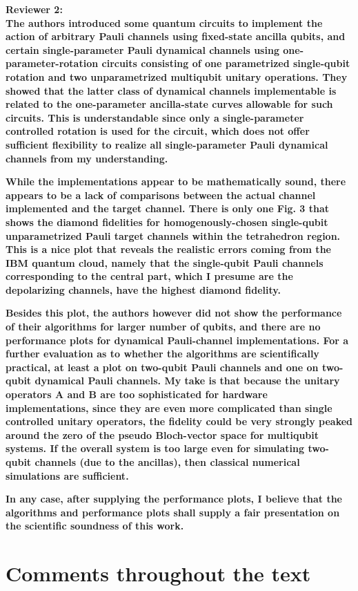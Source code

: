\documentclass[10pt,letterpaper]{article} %
\begin{document}
\textbf{Reviewer 2:} \\
\textbf{The authors introduced some quantum circuits to implement the action
of arbitrary Pauli channels using fixed-state ancilla qubits, and
certain single-parameter Pauli dynamical channels using
one-parameter-rotation circuits consisting of one parametrized
single-qubit rotation and two unparametrized multiqubit unitary
operations. They showed that the latter class of dynamical channels
implementable is related to the one-parameter ancilla-state curves
allowable for such circuits. This is understandable since only a
single-parameter controlled rotation is used for the circuit, which
does not offer sufficient flexibility to realize all single-parameter
Pauli dynamical channels from my understanding.}

\textbf{While the implementations appear to be mathematically sound, there
appears to be a lack of comparisons between the actual channel
implemented and the target channel. There is only one Fig. 3 that
shows the diamond fidelities for homogenously-chosen single-qubit
unparametrized Pauli target channels within the tetrahedron region.
This is a nice plot that reveals the realistic errors coming from the
IBM quantum cloud, namely that the single-qubit Pauli channels
corresponding to the central part, which I presume are the
depolarizing channels, have the highest diamond fidelity.}

\textbf{
Besides this plot, the authors however did not show the performance of
their algorithms for larger number of qubits, and there are no
performance plots for dynamical Pauli-channel implementations. For a
further evaluation as to whether the algorithms are scientifically
practical, at least a plot on two-qubit Pauli channels and one on
two-qubit dynamical Pauli channels. My take is that because the
unitary operators A and B are too sophisticated for hardware
implementations, since they are even more complicated than single
controlled unitary operators, the fidelity could be very strongly
peaked around the zero of the pseudo Bloch-vector space for multiqubit
systems. If the overall system is too large even for simulating
two-qubit channels (due to the ancillas), then classical numerical
simulations are sufficient.}

\textbf{
In any case, after supplying the performance plots, I believe that the
algorithms and performance plots shall supply a fair presentation on
the scientific soundness of this work.}




\section{Comments throughout the text}
\end{document}
